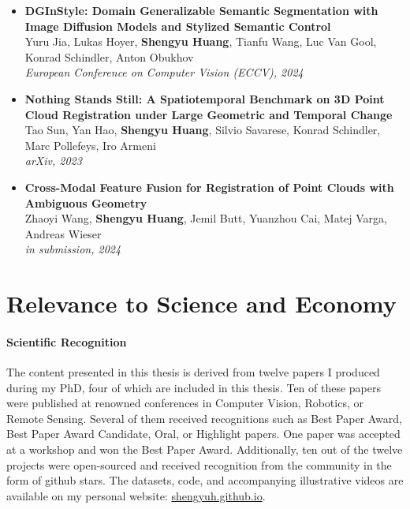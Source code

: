 \begin{itemize}
    \item \noindent\textbf{ DGInStyle: Domain Generalizable Semantic Segmentation with Image Diffusion Models and Stylized Semantic Control} \\[0.5em]
    Yuru Jia, Lukas Hoyer, \textbf{Shengyu Huang}, Tianfu Wang, Luc Van Gool, Konrad Schindler, Anton Obukhov \\
    \textit{European Conference on Computer Vision (ECCV), 2024}
    
    \item \noindent\textbf{ Nothing Stands Still: A Spatiotemporal Benchmark on 3D Point Cloud Registration under Large Geometric and Temporal Change} \\[0.5em]
    Tao Sun, Yan Hao, \textbf{Shengyu Huang}, Silvio Savarese, Konrad Schindler, Marc Pollefeys, Iro Armeni \\
    \textit{arXiv, 2023}
    
    \item \noindent\textbf{ Cross-Modal Feature Fusion for Registration of Point Clouds with Ambiguous Geometry} \\[0.5em]
    Zhaoyi Wang, \textbf{Shengyu Huang}, Jemil Butt, Yuanzhou Cai, Matej Varga, Andreas Wieser \\
    \textit{in submission, 2024}
\end{itemize}




\section{Relevance to Science and Economy}
\paragraph{Scientific Recognition}
The content presented in this thesis is derived from twelve papers I produced during my PhD, four of which are included in this thesis. Ten of these papers were published at renowned conferences in Computer Vision, Robotics, or Remote Sensing. Several of them received recognitions such as Best Paper Award, Best Paper Award Candidate, Oral, or Highlight papers. One paper was accepted at a workshop and won the Best Paper Award. Additionally, ten out of the twelve projects were open-sourced and received recognition from the community in the form of github stars. The datasets, code, and accompanying illustrative videos are available on my personal website: \url{shengyuh.github.io}.

